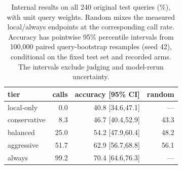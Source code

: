 \begin{table}[h]
\centering\small
\caption{Internal results on all 240 original test queries (\%), with unit query weights. Random mixes the measured local/always endpoints at the corresponding call rate. Accuracy has pointwise 95\% percentile intervals from 100,000 paired query-bootstrap resamples (seed 42), conditional on the fixed test set and recorded arms. The intervals exclude judging and model-rerun uncertainty.}
\label{tab:live}
\begin{tabular}{lrrr}
\toprule
tier & calls & accuracy [95\% CI] & random \\
\midrule
local-only & 0.0 & 40.8 [34.6,47.1] & --- \\
conservative & 8.3 & 46.7 [40.4,52.9] & 43.3 \\
balanced & 25.0 & 54.2 [47.9,60.4] & 48.2 \\
aggressive & 51.7 & 62.9 [56.7,68.8] & 56.1 \\
always & 99.2 & 70.4 [64.6,76.3] & --- \\
\bottomrule
\end{tabular}
\end{table}
